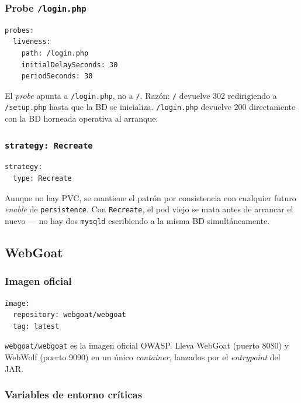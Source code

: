 \subsubsection{Probe \texttt{/login.php}}

\begin{lstlisting}[style=yaml]
probes:
  liveness:
    path: /login.php
    initialDelaySeconds: 30
    periodSeconds: 30
\end{lstlisting}

El \emph{probe} apunta a \texttt{/login.php}, no a \texttt{/}. Razón: \texttt{/} devuelve 302 redirigiendo a \texttt{/setup.php} hasta que la BD se inicializa. \texttt{/login.php} devuelve 200 directamente con la BD horneada operativa al arranque.

\subsubsection{\texttt{strategy: Recreate}}

\begin{lstlisting}[style=yaml]
strategy:
  type: Recreate
\end{lstlisting}

Aunque no hay PVC, se mantiene el patrón por consistencia con cualquier futuro \emph{enable} de \texttt{persistence}. Con \texttt{Recreate}, el pod viejo se mata antes de arrancar el nuevo --- no hay dos \texttt{mysqld} escribiendo a la misma BD simultáneamente.

\subsection{WebGoat}

\subsubsection{Imagen oficial}

\begin{lstlisting}[style=yaml]
image:
  repository: webgoat/webgoat
  tag: latest
\end{lstlisting}

\texttt{webgoat/webgoat} es la imagen oficial OWASP. Lleva WebGoat (puerto 8080) y WebWolf (puerto 9090) en un único \emph{container}, lanzados por el \emph{entrypoint} del JAR.

\subsubsection{Variables de entorno críticas}

